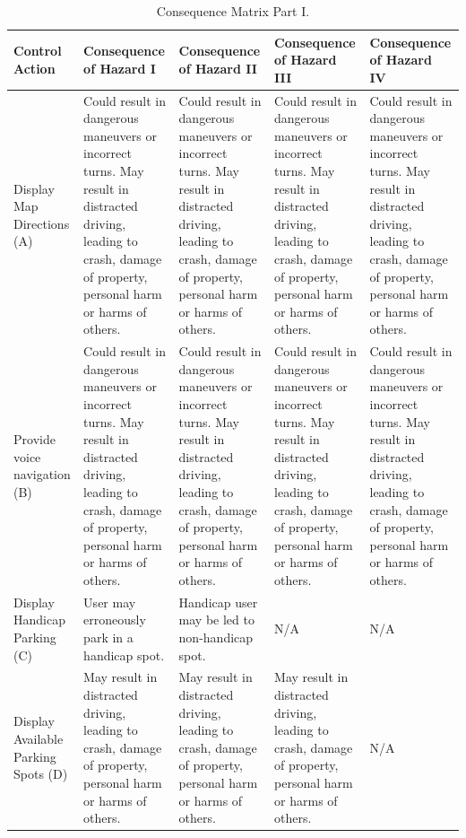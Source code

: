 \documentclass[]{article}
\begin{document}
	\begin{table}
		\begin{tabular}{ | m{2.5cm} | m{3cm}| m{3cm}| m{3cm}| m{3cm} |} 
			\hline
			Control Action & 
			Consequence of Hazard I
			& 
			Consequence of Hazard II
			& 
			Consequence of Hazard III
			& 
			Consequence of Hazard IV
			\\ [0.5ex] 
			\hline
			Display Map Directions (A) & Could result in dangerous maneuvers or incorrect turns. May result in distracted driving, leading to crash, damage of property, personal harm or harms of others. & Could result in dangerous maneuvers or incorrect turns. May result in distracted driving, leading to crash, damage of property, personal harm or harms of others.
			& Could result in dangerous maneuvers or incorrect turns. May result in distracted driving, leading to crash, damage of property, personal harm or harms of others. & Could result in dangerous maneuvers or incorrect turns. May result in distracted driving, leading to crash, damage of property, personal harm or harms of others. \\ 
			\hline 
			Provide voice navigation (B) & Could result in dangerous maneuvers or incorrect turns. May result in distracted driving, leading to crash, damage of property, personal harm or harms of others. & Could result in dangerous maneuvers or incorrect turns. May result in distracted driving, leading to crash, damage of property, personal harm or harms of others.
			& Could result in dangerous maneuvers or incorrect turns. May result in distracted driving, leading to crash, damage of property, personal harm or harms of others. & Could result in dangerous maneuvers or incorrect turns. May result in distracted driving, leading to crash, damage of property, personal harm or harms of others. \\ 
			\hline 
			Display Handicap Parking (C) & User may erroneously park in a handicap spot. & Handicap user may be led to non-handicap spot. & N/A & N/A \\
			\hline
			Display Available Parking Spots (D) &May result in distracted driving, leading to crash, damage of property, personal harm or harms of others. & May result in distracted driving, leading to crash, damage of property, personal harm or harms of others. & May result in distracted driving, leading to crash, damage of property, personal harm or harms of others. & N/A \\		
			\hline
		\end{tabular}
		\caption{Consequence Matrix Part I.}
 \end{table}
\end{document}
